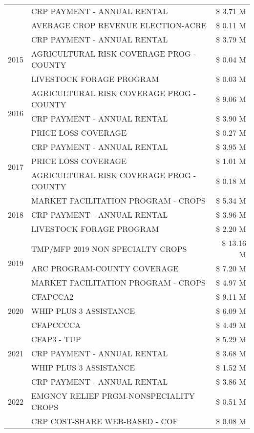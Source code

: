\begin{tabular}{llr}
 & CRP PAYMENT - ANNUAL RENTAL & \$ 3.71 M \\
 & AVERAGE CROP REVENUE ELECTION-ACRE & \$ 0.11 M \\
\cline{1-3}
\multirow[t]{3}{*}{2015} & CRP PAYMENT - ANNUAL RENTAL & \$ 3.79 M \\
 & AGRICULTURAL RISK COVERAGE PROG - COUNTY & \$ 0.04 M \\
 & LIVESTOCK FORAGE PROGRAM & \$ 0.03 M \\
\cline{1-3}
\multirow[t]{3}{*}{2016} & AGRICULTURAL RISK COVERAGE PROG - COUNTY & \$ 9.06 M \\
 & CRP PAYMENT - ANNUAL RENTAL & \$ 3.90 M \\
 & PRICE LOSS COVERAGE & \$ 0.27 M \\
\cline{1-3}
\multirow[t]{3}{*}{2017} & CRP PAYMENT - ANNUAL RENTAL & \$ 3.95 M \\
 & PRICE LOSS COVERAGE & \$ 1.01 M \\
 & AGRICULTURAL RISK COVERAGE PROG - COUNTY & \$ 0.18 M \\
\cline{1-3}
\multirow[t]{3}{*}{2018} & MARKET FACILITATION PROGRAM - CROPS & \$ 5.34 M \\
 & CRP PAYMENT - ANNUAL RENTAL & \$ 3.96 M \\
 & LIVESTOCK FORAGE PROGRAM & \$ 2.20 M \\
\cline{1-3}
\multirow[t]{3}{*}{2019} & TMP/MFP 2019 NON SPECIALTY CROPS & \$ 13.16 M \\
 & ARC PROGRAM-COUNTY COVERAGE & \$ 7.20 M \\
 & MARKET FACILITATION PROGRAM - CROPS & \$ 4.97 M \\
\cline{1-3}
\multirow[t]{3}{*}{2020} & CFAPCCA2 & \$ 9.11 M \\
 & WHIP PLUS 3 ASSISTANCE & \$ 6.09 M \\
 & CFAPCCCCA & \$ 4.49 M \\
\cline{1-3}
\multirow[t]{3}{*}{2021} & CFAP3 - TUP & \$ 5.29 M \\
 & CRP PAYMENT - ANNUAL RENTAL & \$ 3.68 M \\
 & WHIP PLUS 3 ASSISTANCE & \$ 1.52 M \\
\cline{1-3}
\multirow[t]{3}{*}{2022} & CRP PAYMENT - ANNUAL RENTAL & \$ 3.86 M \\
 & EMGNCY RELIEF PRGM-NONSPECIALITY CROPS & \$ 0.51 M \\
 & CRP COST-SHARE WEB-BASED - COF & \$ 0.08 M \\
\cline{1-3}
\bottomrule
\end{tabular}
